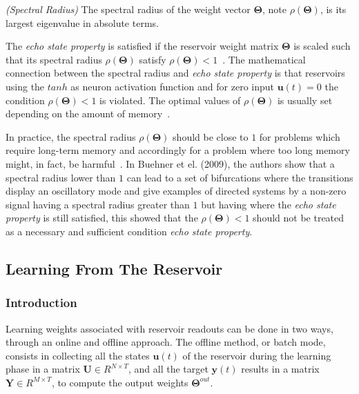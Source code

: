 \documentclass{WitsPhysicsReport}
\begin{document}
\begin{definition}
\emph{(Spectral Radius)}
The spectral radius of the weight vector $\mathbf{\Theta}$, note $\rho (\mathbf{\Theta})$, is its largest eigenvalue in absolute terms.
\label{def: spectra_radius}
\end{definition}

The \textit{echo state property} is satisfied if the reservoir weight matrix  $\mathbf{\Theta}$ is scaled such that its spectral radius $\rho (\mathbf{\Theta})$ satisfy $\rho (\mathbf{\Theta}) < 1$~\cite{jaeger2001echo}. The mathematical connection between the spectral radius and \textit{echo state property} is that reservoirs using the $tanh$  as neuron activation function and for zero input  $\mathbf{u}(t) =0$ the condition $\rho (\mathbf{\Theta}) < 1$  is violated. The optimal values of $\rho (\mathbf{\Theta})$ is usually set depending on the  amount of memory~\cite{lukovsevivcius2009reservoir,jaeger2001echo}. 

In practice, the spectral radius $\rho (\mathbf{\Theta})$ should be close to $1$ for problems which require long-term memory and accordingly for a problem where too long memory might, in fact, be harmful~\cite{lukovsevivcius2009reservoir}. In Buehner et el. (2009), the authors show that a spectral radius lower than $1$ can lead to a set of bifurcations where the transitions display an oscillatory mode and give examples of directed systems by a non-zero signal having a spectral radius greater than $1$ but having  where the \textit{echo state property} is still satisfied, this showed that the $\rho (\mathbf{\Theta}) < 1$ should not be treated as a necessary and sufficient condition \textit{echo state property}.



\newpage


\subsection{Learning From The Reservoir}
\label{sec:Learning}
\subsubsection{Introduction}
Learning weights associated with reservoir readouts can be done in two ways, through an online and offline approach. The offline method, or batch mode, consists in collecting all the states $\mathbf{u}(t)$ of the reservoir during the learning phase in a matrix $\mathbf{U} \in R^{N \times T}$, and all the target $\mathbf{y}(t)$  results in a matrix $\mathbf{Y} \in R^{M \times T}$, to compute the output weights $\mathbf{\Theta}^{out}$.
\end{document}
